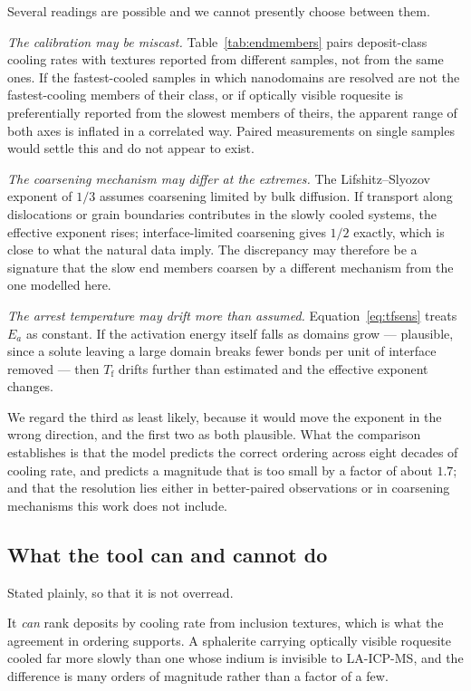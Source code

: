 \documentclass[11pt,a4paper]{article}
\newcommand{\Tf}{T_{\mathrm{f}}}
\begin{document}
Several readings are possible and we cannot presently choose between them.

\emph{The calibration may be miscast.} Table~\ref{tab:endmembers} pairs
deposit-class cooling rates with textures reported from different samples, not
from the same ones. If the fastest-cooled samples in which nanodomains are
resolved are not the fastest-cooling members of their class, or if optically
visible roquesite is preferentially reported from the slowest members of theirs,
the apparent range of both axes is inflated in a correlated way. Paired
measurements on single samples would settle this and do not appear to exist.

\emph{The coarsening mechanism may differ at the extremes.} The
Lifshitz--Slyozov exponent of $1/3$ assumes coarsening limited by bulk
diffusion. If transport along dislocations or grain boundaries contributes in
the slowly cooled systems, the effective exponent rises; interface-limited
coarsening gives $1/2$ exactly, which is close to what the natural data imply.
The discrepancy may therefore be a signature that the slow end members coarsen
by a different mechanism from the one modelled here.

\emph{The arrest temperature may drift more than assumed.}
Equation~\eqref{eq:tfsens} treats $E_a$ as constant. If the activation energy
itself falls as domains grow --- plausible, since a solute leaving a large domain
breaks fewer bonds per unit of interface removed --- then $\Tf$ drifts further
than estimated and the effective exponent changes.

We regard the third as least likely, because it would move the exponent in the
wrong direction, and the first two as both plausible. What the comparison
establishes is that the model predicts the correct ordering across eight decades
of cooling rate, and predicts a magnitude that is too small by a factor of about
$1.7$; and that the resolution lies either in better-paired observations or in
coarsening mechanisms this work does not include.

\subsection{What the tool can and cannot do}

Stated plainly, so that it is not overread.

It \emph{can} rank deposits by cooling rate from inclusion textures, which is
what the agreement in ordering supports. A sphalerite carrying optically visible
roquesite cooled far more slowly than one whose indium is invisible to
LA-ICP-MS, and the difference is many orders of magnitude rather than a factor
of a few.
\end{document}
